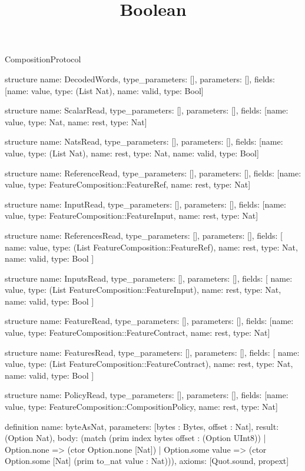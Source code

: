 \begin{lexlean}{CompositionProtocol}
\title{Boolean}
\begin{semanticmodule}
structure{
  name: DecodedWords,
  type_parameters: [],
  parameters: [],
  fields: [{name: value, type: (List Nat)}, {name: valid, type: Bool}]
}

structure{
  name: ScalarRead,
  type_parameters: [],
  parameters: [],
  fields: [{name: value, type: Nat}, {name: rest, type: Nat}]
}

structure{
  name: NatsRead,
  type_parameters: [],
  parameters: [],
  fields: [{name: value, type: (List Nat)}, {name: rest, type: Nat}, {name: valid, type: Bool}]
}

structure{
  name: ReferenceRead,
  type_parameters: [],
  parameters: [],
  fields: [{name: value, type: FeatureComposition::FeatureRef}, {name: rest, type: Nat}]
}

structure{
  name: InputRead,
  type_parameters: [],
  parameters: [],
  fields: [{name: value, type: FeatureComposition::FeatureInput}, {name: rest, type: Nat}]
}

structure{
  name: ReferencesRead,
  type_parameters: [],
  parameters: [],
  fields: [
    {name: value, type: (List FeatureComposition::FeatureRef)},
    {name: rest, type: Nat},
    {name: valid, type: Bool}
  ]
}

structure{
  name: InputsRead,
  type_parameters: [],
  parameters: [],
  fields: [
    {name: value, type: (List FeatureComposition::FeatureInput)},
    {name: rest, type: Nat},
    {name: valid, type: Bool}
  ]
}

structure{
  name: FeatureRead,
  type_parameters: [],
  parameters: [],
  fields: [{name: value, type: FeatureComposition::FeatureContract}, {name: rest, type: Nat}]
}

structure{
  name: FeaturesRead,
  type_parameters: [],
  parameters: [],
  fields: [
    {name: value, type: (List FeatureComposition::FeatureContract)},
    {name: rest, type: Nat},
    {name: valid, type: Bool}
  ]
}

structure{
  name: PolicyRead,
  type_parameters: [],
  parameters: [],
  fields: [{name: value, type: FeatureComposition::CompositionPolicy}, {name: rest, type: Nat}]
}

definition{
  name: byteAsNat,
  parameters: [bytes : Bytes, offset : Nat],
  result: (Option Nat),
  body: (match (prim index bytes offset : (Option UInt8))
    | Option.none => (ctor Option.none [Nat])
    | Option.some value => (ctor Option.some [Nat] (prim to_nat value : Nat))),
  axioms: [Quot.sound, propext]
}


\end{semanticmodule}
\end{lexlean}
